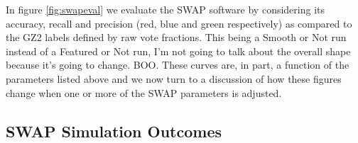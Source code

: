 \documentclass[twocolumn]{aastex6}
\begin{document}
In figure \ref{fig:swapeval} we evaluate the SWAP software by considering
its accuracy, recall and precision (red, blue and green respectively) as compared 
to the GZ2 labels defined by raw vote fractions.  This being a Smooth or Not run
instead of a Featured or Not run, I'm not going to talk about the overall shape
because it's going to change. BOO. These curves are, in part, a 
function of the parameters listed above and we now turn to a discussion of 
how these figures change when one or more of the SWAP parameters is adjusted. 


\subsection{SWAP Simulation Outcomes}
\end{document}
